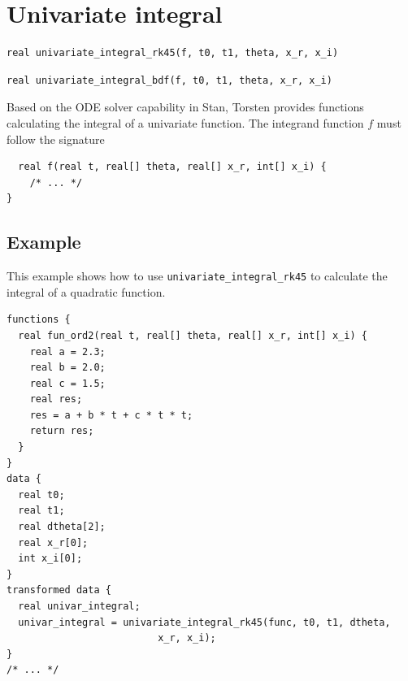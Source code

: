 \documentclass[11pt, reqno, oneside]{amsbook}
\numberwithin{equation}{chapter}
\numberwithin{figure}{chapter}
\numberwithin{table}{chapter}
\theoremstyle{remark}
\begin{document}
\section{Univariate integral}
\label{sec:org6318779}
\begin{verbatim}
real univariate_integral_rk45(f, t0, t1, theta, x_r, x_i)
\end{verbatim}
\begin{verbatim}
real univariate_integral_bdf(f, t0, t1, theta, x_r, x_i)
\end{verbatim}
Based on the ODE solver capability in Stan, Torsten provides functions
calculating the integral of a univariate function. The integrand function \(f\) must follow the signature
\begin{verbatim}
  real f(real t, real[] theta, real[] x_r, int[] x_i) {
    /* ... */
}
\end{verbatim}

\subsection{Example}
\label{sec:orgd1f3dc4}
This example shows how to use \texttt{univariate\_integral\_rk45} to calculate the
integral of a quadratic function.
\begin{verbatim}
functions {
  real fun_ord2(real t, real[] theta, real[] x_r, int[] x_i) {
    real a = 2.3;
    real b = 2.0;
    real c = 1.5;
    real res;
    res = a + b * t + c * t * t;
    return res;
  }
}
data {
  real t0;
  real t1;
  real dtheta[2];
  real x_r[0];
  int x_i[0];
}
transformed data {
  real univar_integral;
  univar_integral = univariate_integral_rk45(func, t0, t1, dtheta, 
                          x_r, x_i);
}
/* ... */
\end{verbatim}
\end{document}
